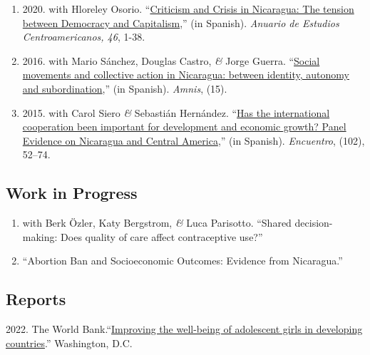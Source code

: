 \documentclass[a4paper, 10pt]{article}
\renewenvironment{itemize}{
  \begin{list}{}
    { \setlength{\itemsep}{5pt}
      \setlength{\parsep}{0pt}
      \setlength{\topsep}{0pt}
      \setlength{\leftmargin}{0em} } }{
  \end{list}}
\begin{document}
\begin{enumerate}[leftmargin=10pt, label={}, itemindent=-10pt, nosep]
\item 2020. with Hloreley Osorio. ``\href{https://revistas.ucr.ac.cr/index.php/anuario/article/view/45081/44860}{Criticism and Crisis in Nicaragua: The tension between Democracy and Capitalism},'' (in Spanish). \emph{Anuario de Estudios Centroamericanos, 46}, 1-38.

\item 2016. with Mario Sánchez, Douglas Castro, \textit{\&} Jorge Guerra. ``\href{https://amnis.revues.org/2813}{Social movements and collective action in Nicaragua: between identity, autonomy and subordination},'' (in Spanish). \emph{Amnis}, (15).

\item 2015. with Carol Siero \textit{\&} Sebastián Hernández. ``\href{http://www.uca.edu.ni/2/images/Revista-Encuentro/Revistas/e102/art-5.pdf}{Has the international cooperation been important for development and economic growth? Panel Evidence on Nicaragua and Central America},'' (in Spanish). \emph{Encuentro}, (102), 52--74.
\end{enumerate}


\subsection*{Work in Progress}

\begin{enumerate}[leftmargin=10pt, label={}, itemindent=-10pt, nosep]
  \item with Berk Özler, Katy Bergstrom, \textit{\&} Luca Parisotto. ``Shared decision-making: Does quality of care affect contraceptive use?''
  \item ``Abortion Ban and Socioeconomic Outcomes: Evidence from Nicaragua.''
\end{enumerate}

\subsection*{Reports}

\begin{itemize}
  \item 2022. The World Bank.``\href{https://documents1.worldbank.org/curated/en/099025312242111019/pdf/P1699940bcc13001a083820804f74e8151b.pdf}{Improving the well-being of adolescent girls in developing countries}.'' Washington, D.C.
\end{itemize}
\end{document}
